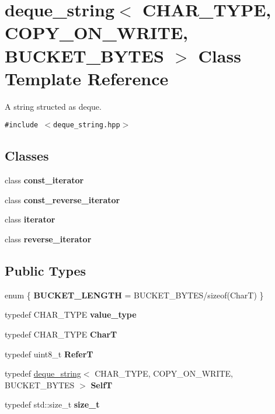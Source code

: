 \hypertarget{classdeque__string}{
\section{deque\_\-string$<$ CHAR\_\-TYPE, COPY\_\-ON\_\-WRITE, BUCKET\_\-BYTES $>$ Class Template Reference}
\label{classdeque__string}
}
A string structed as deque.  


{\tt \#include $<$deque\_\-string.hpp$>$}

\subsection*{Classes}
\begin{CompactItemize}
\item 
class \textbf{const\_\-iterator}
\item 
class \textbf{const\_\-reverse\_\-iterator}
\item 
class \textbf{iterator}
\item 
class \textbf{reverse\_\-iterator}
\end{CompactItemize}
\subsection*{Public Types}
\begin{CompactItemize}
\item 
enum \{ \textbf{BUCKET\_\-LENGTH} =  BUCKET\_\-BYTES/sizeof(CharT)
 \}
\item 
\hypertarget{classdeque__string_bb2a4ca7ca164fa3ce2985cc745dc755}{
typedef CHAR\_\-TYPE \textbf{value\_\-type}}
\label{classdeque__string_bb2a4ca7ca164fa3ce2985cc745dc755}

\item 
\hypertarget{classdeque__string_e1c3a129a6d12a43934ee7da4f349275}{
typedef CHAR\_\-TYPE \textbf{CharT}}
\label{classdeque__string_e1c3a129a6d12a43934ee7da4f349275}

\item 
\hypertarget{classdeque__string_9a731411f00a88c9295b0d5d7036b5af}{
typedef uint8\_\-t \textbf{ReferT}}
\label{classdeque__string_9a731411f00a88c9295b0d5d7036b5af}

\item 
\hypertarget{classdeque__string_8400a22c48eef887be1a207a86ea74f1}{
typedef \hyperlink{classdeque__string}{deque\_\-string}$<$ CHAR\_\-TYPE, COPY\_\-ON\_\-WRITE, BUCKET\_\-BYTES $>$ \textbf{SelfT}}
\label{classdeque__string_8400a22c48eef887be1a207a86ea74f1}

\item 
\hypertarget{classdeque__string_9d136986d9775974e243182bc6efa3f6}{
typedef std::size\_\-t \textbf{size\_\-t}}
\label{classdeque__string_9d136986d9775974e243182bc6efa3f6}

\end{CompactItemize}
